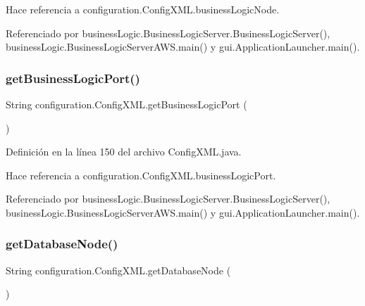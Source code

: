 Hace referencia a configuration.\+Config\+X\+M\+L.\+business\+Logic\+Node.



Referenciado por business\+Logic.\+Business\+Logic\+Server.\+Business\+Logic\+Server(), business\+Logic.\+Business\+Logic\+Server\+A\+W\+S.\+main() y gui.\+Application\+Launcher.\+main().

\mbox{\label{classconfiguration_1_1ConfigXML_a7e8cb431bc1e899176ae2891c007f7f3}} 
\subsubsection{\texorpdfstring{getBusinessLogicPort()}{getBusinessLogicPort()}}
{\footnotesize\ttfamily String configuration.\+Config\+X\+M\+L.\+get\+Business\+Logic\+Port (\begin{DoxyParamCaption}{ }\end{DoxyParamCaption})}



Definición en la línea 150 del archivo Config\+X\+M\+L.\+java.


\begin{DoxyCode}{0}

\end{DoxyCode}


Hace referencia a configuration.\+Config\+X\+M\+L.\+business\+Logic\+Port.



Referenciado por business\+Logic.\+Business\+Logic\+Server.\+Business\+Logic\+Server(), business\+Logic.\+Business\+Logic\+Server\+A\+W\+S.\+main() y gui.\+Application\+Launcher.\+main().

\mbox{\label{classconfiguration_1_1ConfigXML_a622fdcb9a55b406b6bc2fa63509dae72}} 
\subsubsection{\texorpdfstring{getDatabaseNode()}{getDatabaseNode()}}
{\footnotesize\ttfamily String configuration.\+Config\+X\+M\+L.\+get\+Database\+Node (\begin{DoxyParamCaption}{ }\end{DoxyParamCaption})}



